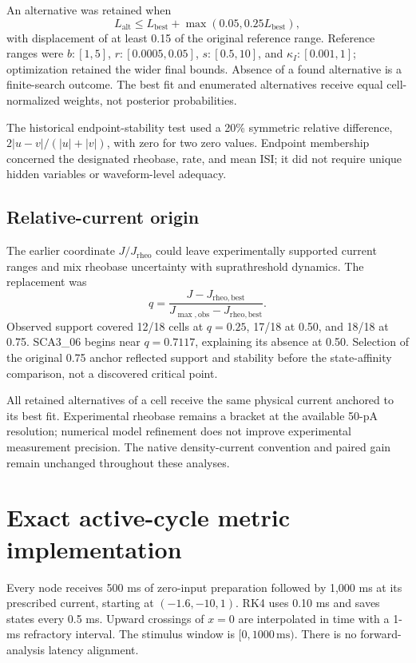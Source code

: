 \documentclass[11pt,a4paper]{article}
\begin{document}
An alternative was retained when
\[L_{\mathrm{alt}}\leq L_{\mathrm{best}}+\max(0.05,0.25L_{\mathrm{best}}),\]
with displacement of at least 0.15 of the original reference range. Reference ranges were $b:[1,5]$, $r:[0.0005,0.05]$, $s:[0.5,10]$, and $\kappa_I:[0.001,1]$; optimization retained the wider final bounds. Absence of a found alternative is a finite-search outcome. The best fit and enumerated alternatives receive equal cell-normalized weights, not posterior probabilities.

The historical endpoint-stability test used a 20\% symmetric relative difference, $2|u-v|/(|u|+|v|)$, with zero for two zero values. Endpoint membership concerned the designated rheobase, rate, and mean ISI; it did not require unique hidden variables or waveform-level adequacy.

\subsection*{Relative-current origin}
The earlier coordinate $J/J_{\mathrm{rheo}}$ could leave experimentally supported current ranges and mix rheobase uncertainty with suprathreshold dynamics. The replacement was
\[q=\frac{J-J_{\mathrm{rheo,best}}}{J_{\max,\mathrm{obs}}-J_{\mathrm{rheo,best}}}.\]
Observed support covered 12/18 cells at $q=0.25$, 17/18 at 0.50, and 18/18 at 0.75. SCA3\_06 begins near $q=0.7117$, explaining its absence at 0.50. Selection of the original 0.75 anchor reflected support and stability before the state-affinity comparison, not a discovered critical point.

All retained alternatives of a cell receive the same physical current anchored to its best fit. Experimental rheobase remains a bracket at the available 50-pA resolution; numerical model refinement does not improve experimental measurement precision. The native density-current convention and paired gain remain unchanged throughout these analyses.

\section{Exact active-cycle metric implementation}\label{s:active}
Every node receives 500 ms of zero-input preparation followed by 1,000 ms at its prescribed current, starting at $(-1.6,-10,1)$. RK4 uses 0.10 ms and saves states every 0.5 ms. Upward crossings of $x=0$ are interpolated in time with a 1-ms refractory interval. The stimulus window is $[0,1000\,\mathrm{ms})$. There is no forward-analysis latency alignment.
\end{document}

